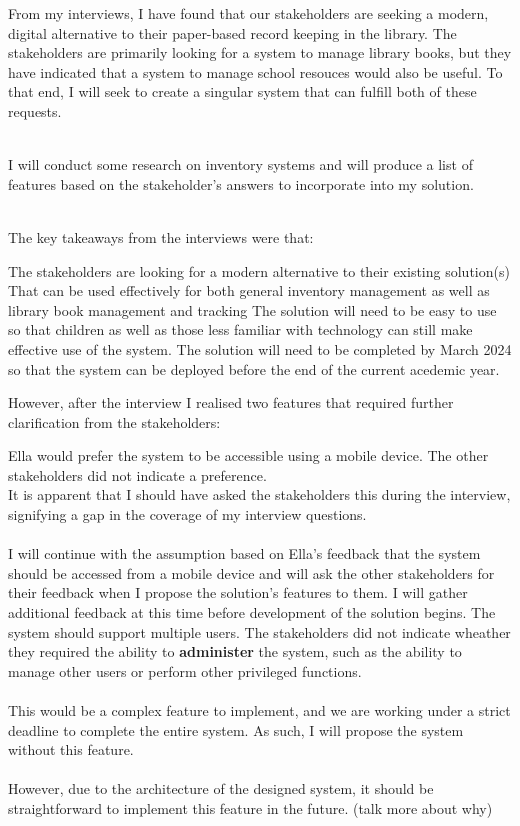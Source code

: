 \documentclass[../../../main.tex]{subfiles}
\begin{document}
\noindent From my interviews, I have found that our stakeholders are seeking a modern, digital alternative
to their paper-based record keeping in the library. The stakeholders are primarily looking for
a system to manage library books, but they have indicated that a system to manage school
resouces would also be useful. To that end, I will seek to create a singular system that can fulfill both of these requests.

\noindent \\ I will conduct some research on inventory systems and will produce a list of features based on the stakeholder's answers to incorporate into my solution.

\noindent \\ The key takeaways from the interviews were that:

\begin{outline}
    \1 The stakeholders are looking for a modern alternative to their existing solution(s)
    \1 That can be used effectively for both general inventory management as well as library book management and tracking
    \1 The solution will need to be easy to use so that children as well as those less familiar with technology can still make effective use of the system.
    \1 The solution will need to be completed by March 2024 so that the system can be deployed before the end of the current acedemic year.
\end{outline}

\noindent However, after the interview I realised two features that required further clarification from the stakeholders:

\begin{outline}
    \1 Ella would prefer the system to be accessible using a mobile device.
    \2 The other stakeholders did not indicate a preference. \\
    It is apparent that I should have asked the stakeholders this during the interview, signifying a gap in the coverage of my interview questions. \\\\
    I will continue with the assumption based on Ella's feedback that the system should be accessed from a mobile device and will ask the other stakeholders for their feedback when I propose the solution's features to them. I will gather additional feedback at this time before development of the solution begins.
    \1 The system should support multiple users.
    \2 The stakeholders did not indicate wheather they required the ability to \textbf{administer} the system, such as the ability to manage other users or perform other privileged functions.\\\\
    This would be a complex feature to implement, and we are working under a strict deadline to complete the entire system. As such, I will propose the system without this feature.\\\\
    However, due to the architecture of the designed system, it should be straightforward to implement this feature in the future. (talk more about why)

\end{outline}
\end{document}
